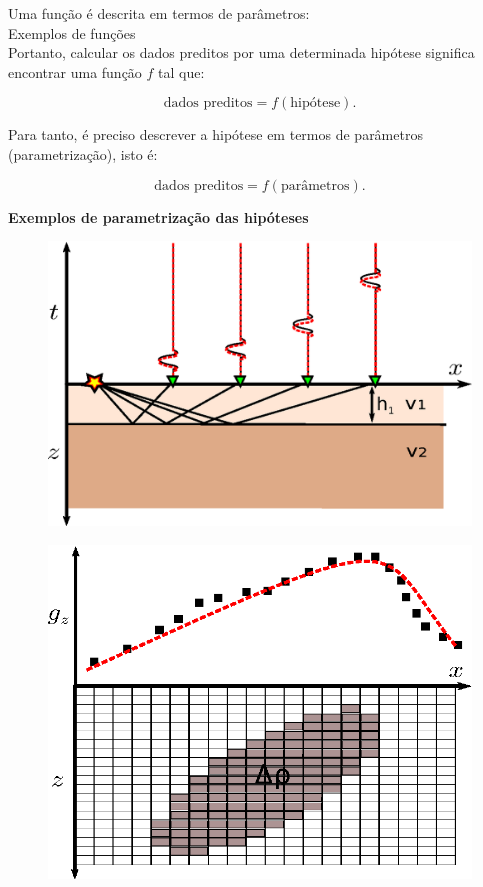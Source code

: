 Uma função é descrita em termos de parâmetros:
\\
Exemplos de funções
\\
\indent Portanto, calcular os dados preditos por uma determinada hipótese significa
encontrar uma função $f$ tal que:

\[
\text{dados preditos} = f(\text{hipótese}).
\]

\indent Para tanto, é preciso descrever a hipótese em termos de parâmetros
(parametrização), isto é:

\[
\text{dados preditos} = f(\text{parâmetros}).
\]

{\bf Exemplos de parametrização das hipóteses}

\begin{figure}
    \centering
    \includegraphics[scale=1]{../figs/params-seismic.eps}
    \caption{}
    \label{params-seismic}
\end{figure}

\begin{figure}
    \centering
    \includegraphics[scale=1]{../figs/params-grav.eps}
    \caption{}
    \label{params-grav}
\end{figure}

